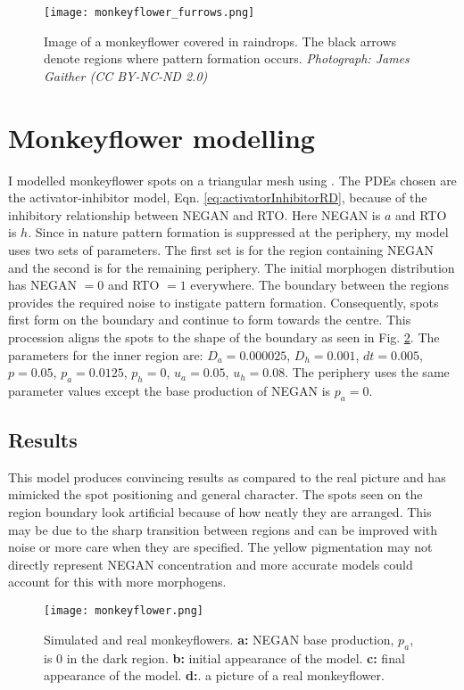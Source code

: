 \begin{figure}[ht]
	\centering
	\texttt{[image: monkeyflower\_furrows.png]}
	\caption{Image of a monkeyflower covered in raindrops. The black arrows denote regions where pattern formation occurs. \textit{Photograph: James Gaither (CC BY-NC-ND 2.0)}}
	\label{fig:monkeyflower_real}
\end{figure}

\section{Monkeyflower modelling}
I modelled monkeyflower spots on a triangular mesh using \ProgramName{}. The PDEs chosen are the activator-inhibitor model, Eqn. \eqref{eq:activatorInhibitorRD}, because of the inhibitory relationship between NEGAN and RTO. Here NEGAN is $a$ and RTO is $h$. Since in nature pattern formation is suppressed at the periphery, my model uses two sets of parameters. The first set is for the region containing NEGAN and the second is for the remaining periphery. The initial morphogen distribution has NEGAN $= 0$ and RTO $= 1$ everywhere. The boundary between the regions provides the required noise to instigate pattern formation. Consequently, spots first form on the boundary and continue to form towards the centre. This procession aligns the spots to the shape of the boundary as seen in Fig. \ref{fig:monkeyflower}. The parameters for the inner region are: $D_a=0.000025$, $D_h=0.001$, $dt=0.005$, $p=0.05$, $p_a=0.0125$, $p_h=0$, $u_a=0.05$, $u_h=0.08$. The periphery uses the same parameter values except the base production of NEGAN is $p_a=0$.

\subsection*{Results}
This model produces convincing results as compared to the real picture and has mimicked the spot positioning and general character. The spots seen on the region boundary look artificial because of how neatly they are arranged. This may be due to the sharp transition between regions and can be improved with noise or more care when they are specified. The yellow pigmentation may not directly represent NEGAN concentration and more accurate models could account for this with more morphogens.

\begin{figure}[ht]
	\centering
	\texttt{[image: monkeyflower.png]}
	\caption{Simulated and real monkeyflowers. \textbf{a:} NEGAN base production, $p_a$, is 0 in the dark region. \textbf{b:} initial appearance of the model. \textbf{c:} final appearance of the model. \textbf{d:}. a picture of a real monkeyflower.}
	\label{fig:monkeyflower}
\end{figure}


